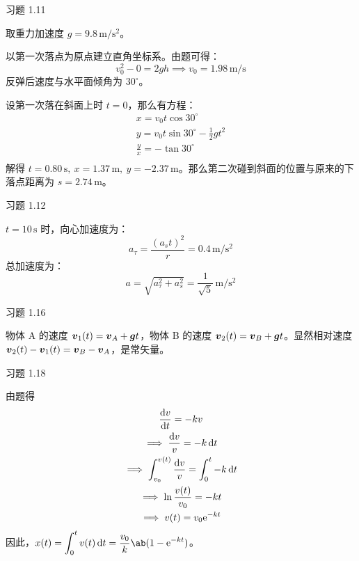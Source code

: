 \begin{problem}
    习题 1.11
    \begin{solution}
        取重力加速度 $g = 9.8\,\mathrm{m / s^2}$。

        以第一次落点为原点建立直角坐标系。由题可得：
        $$
        v_0^2 - 0 = 2 g h \implies v_0 = 1.98\,\mathrm{m / s}
        $$
        反弹后速度与水平面倾角为 $30^\circ$。

        设第一次落在斜面上时 $t = 0$，那么有方程：
        $$
        \begin{gathered}
            x = v_0 t \cos 30^\circ \\
            y = v_0 t \sin 30^\circ - \frac{1}{2} g t^2 \\
            \frac{y}{x} = -\tan 30^\circ \\
        \end{gathered}
        $$
        解得 $t = 0.80\,\mathrm{s},\ x = 1.37\,\mathrm{m},\ y = -2.37\,\mathrm{m}$。那么第二次碰到斜面的位置与原来的下落点距离为 $s = 2.74\,\mathrm{m}$。
    \end{solution}
\end{problem}

\begin{problem}
    习题 1.12
    \begin{solution}
        $t = 10\,\mathrm{s}$ 时，向心加速度为：
        $$
        a_{\tau} = \frac{(a_s t)^2}{r} = 0.4\,\mathrm{m / s^2}
        $$
        总加速度为：
        $$
        a = \sqrt{a_{\tau}^2 + a_s^2} = \frac{1}{\sqrt{5}} \,\mathrm{m / s^2}
        $$
    \end{solution}
\end{problem}

\begin{problem}
    习题 1.16
    \begin{solution}
        物体 A 的速度 $\boldsymbol{v}_1(t) = \boldsymbol{v}_A + \boldsymbol{g} t$，物体 B 的速度 $\boldsymbol{v}_2(t) = \boldsymbol{v}_B + \boldsymbol{g} t$。显然相对速度 $\boldsymbol{v}_2(t) - \boldsymbol{v}_1(t) = \boldsymbol{v}_B - \boldsymbol{v}_A$，是常矢量。
    \end{solution}
\end{problem}

\begin{problem}
    习题 1.18
    \begin{solution}
        由题得
        $$
        \begin{gathered}
            \dv{v}{t} = -k v \\
            \implies \frac{\dd{v}}{v} = -k \dd{t} \\
            \implies \int_{v_0}^{v(t)} \frac{\dd{v}}{v} = \int_0^t -k \dd{t} \\
            \implies \ln \frac{v(t)}{v_0} = -k t \\
            \implies v(t) = v_0 \mathrm{e}^{-k t}
        \end{gathered}
        $$
        因此，$\displaystyle x(t) = \int_0^t v(t) \dd{t} = \frac{v_0}{k} \ab(1 - \E^{-k t})$。
    \end{solution}
\end{problem}

